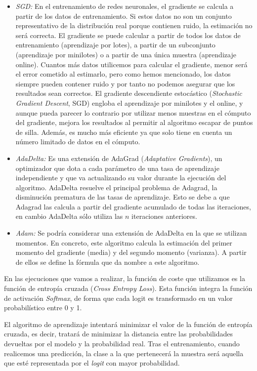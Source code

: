 \begin{itemize}
    \begin{itemize}
        \item \textit{SGD:} En el entrenamiento de redes neuronales, el gradiente se calcula a partir de los datos de entrenamiento. Si estos datos no son un conjunto representativo de la distribución real porque contienen ruido, la estimación no será correcta. El gradiente se puede calcular a partir de todos los datos de entrenamiento (aprendizaje por lotes), a partir de un subconjunto (aprendizaje por minilotes) o a partir de una única muestra (aprendizaje online). Cuantos más datos utilicemos para calcular el gradiente, menor será el error cometido al estimarlo, pero como hemos mencionado, los datos siempre pueden contener ruido y por tanto no podemos asegurar que los resultados sean correctos. El gradiente descendiente estocástico (\textit{Stochastic Gradient Descent}, SGD) engloba el aprendizaje por minilotes y el online, y aunque pueda parecer lo contrario por utilizar menos muestras en el cómputo del gradiente, mejora los resultados al permitir al algoritmo escapar de puntos de silla. Además, es mucho más eficiente ya que solo tiene en cuenta un número limitado de datos en el cómputo.
        \item \textit{AdaDelta:} Es una extensión de AdaGrad (\textit{Adaptative Gradients}), un optimizador que dota a cada parámetro de una tasa de aprendizaje independiente y que va actualizando su valor durante la ejecución del algoritmo. AdaDelta resuelve el principal problema de Adagrad, la disminución prematura de las tasas de aprendizaje. Esto se debe a que Adagrad las calcula a partir del gradiente acumulado de todas las iteraciones, en cambio AdaDelta sólo utiliza las $n$ iteraciones anteriores.
        \item \textit{Adam:} Se podría considerar una extensión de AdaDelta en la que se utilizan momentos. En concreto, este algoritmo calcula la estimación del primer momento del gradiente (media) y del segundo momento (varianza). A partir de ellos se define la fórmula que da nombre a este algoritmo.
    \end{itemize}
\end{itemize}

En las ejecuciones que vamos a realizar, la función de coste que utilizamos es la función de entropía cruzada (\textit{Cross Entropy Loss}). Esta función integra la función de activación \textit{Softmax}, de forma que cada logit es transformado en un valor probabilístico entre 0 y 1. 

El algoritmo de aprendizaje intentará minimizar el valor de la función de entropía cruzada, es decir, tratará de minimizar la distancia entre las probabilidades devueltas por el modelo y la probabilidad real. Tras el entrenamiento, cuando realicemos una predicción, la clase a la que pertenecerá la muestra será aquella que esté representada por el \textit{logit} con mayor probabilidad. \cite{crossentropyloss}

